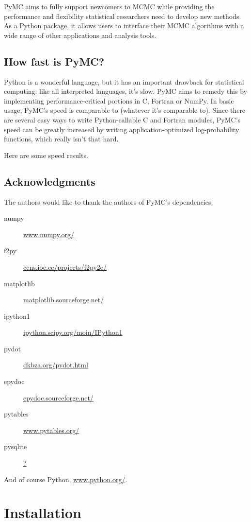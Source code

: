 \documentclass[]{book}
\begin{document}
PyMC aims to fully support newcomers to MCMC while providing the performance and flexibility statistical researchers need to develop new methods. As a Python package, it allows users to interface their MCMC algorithms with a wide range of other applications and analysis tools.

\section{How fast is PyMC?}\label{speed}
Python is a wonderful language, but it has an important drawback for statistical computing: like all interpreted languages, it's slow. PyMC aims to remedy this by implementing performance-critical portions in C, Fortran or NumPy. In basic usage, PyMC's speed is comparable to (whatever it's comparable to). Since there are several easy ways to write Python-callable C and Fortran modules, PyMC's speed can be greatly increased by writing application-optimized log-probability functions, which really isn't that hard.

Here are some speed results.

\section{Acknowledgments}\label{sec:acknowledgments}
The authors would like to thank the authors of PyMC's dependencies:
\begin{description}
	\item[numpy] \href{www.numpy.org/}{www.numpy.org/}
	\item[f2py] \href{cens.ioc.ee/projects/f2py2e/}{cens.ioc.ee/projects/f2py2e/}
	\item[matplotlib] \href{matplotlib.sourceforge.net/}{matplotlib.sourceforge.net/}
	\item[ipython1] \href{ipython.scipy.org/moin/IPython1}{ipython.scipy.org/moin/IPython1}
	\item[pydot] \href{dkbza.org/pydot.html}{dkbza.org/pydot.html}
	\item[epydoc] \href{epydoc.sourceforge.net/}{epydoc.sourceforge.net/}
	\item[pytables] \href{www.pytables.org/}{www.pytables.org/}					
	\item[pysqlite] \href{?}{?}					
\end{description}

And of course Python, \href{www.python.org/}{www.python.org/}.


\chapter{Installation} %
\end{document}
